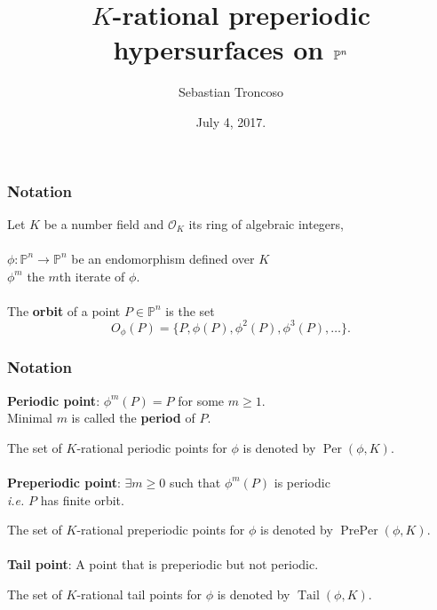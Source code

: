 \documentclass{beamer}
\title[Preperiodic Hypersurfaces]{$K$-rational preperiodic hypersurfaces on $\PP^n$}
\author[S. Troncoso]{Sebastian Troncoso}
\institute[MSU $\rightarrow$ BSC]{Michigan State University\\ $\downarrow$ \\ Birmingham-Southern College}
\date[July 4, 2017.]{ July 4, 2017. \\ \vspace{1cm} }
\def\PP{{\mathbb P}}
\DeclareMathOperator{\Tail}{Tail}
\DeclareMathOperator{\Per}{Per}
\DeclareMathOperator{\PrePer}{PrePer}
\theoremstyle{thmstyle}
\theoremstyle{thmstyle}
\theoremstyle{mystyle}
\theoremstyle{qstnstyle}
\begin{document}
\begin{frame}
\titlepage
\end{frame}

\begin{frame}
\frametitle{Notation}
Let $K$ be a number field  and $\mathcal{O}_K$ its ring of algebraic integers,
\\\quad\\
\pause
$\phi:\mathbb{P}^n\to\mathbb{P}^n$ be an endomorphism defined over $K$ \\ $\phi^m$ the $m$th iterate
of $\phi$.
\\\quad\\
\pause
The \textbf{orbit} of a point $P\in\PP^n$ is the set 
$$ O_{\phi}(P) = \{P, \phi(P),\phi^2(P),\phi^3(P),\ldots \}.$$

\end{frame}


\begin{frame}
\frametitle{Notation}

\textbf{Periodic point}: $\phi^m(P)=P$ for some $m\geq{1}$.
\\\quad\quad \pause Minimal $m$ is called the \textbf{period} of $P$.

\pause
\vspace{2mm}
The set of $K$-rational periodic points for $\phi$ is denoted by $\Per(\phi,K)$.
\\\quad\\
\pause
\textbf{Preperiodic point}: $\exists m\geq{0}$ such that $\phi^m(P)$
is periodic \\\quad\quad \pause \emph{i.e.}  $P$ has finite orbit.

\pause
\vspace{2mm}
The set of $K$-rational preperiodic points for $\phi$ is denoted by $\PrePer(\phi,K)$.
\\\quad\\
\pause
\textbf{Tail point}: A point that is preperiodic but not periodic.

\pause
\vspace{2mm}
The set of $K$-rational tail points for $\phi$ is denoted by $\Tail(\phi,K)$.
\end{frame}
\end{document}
